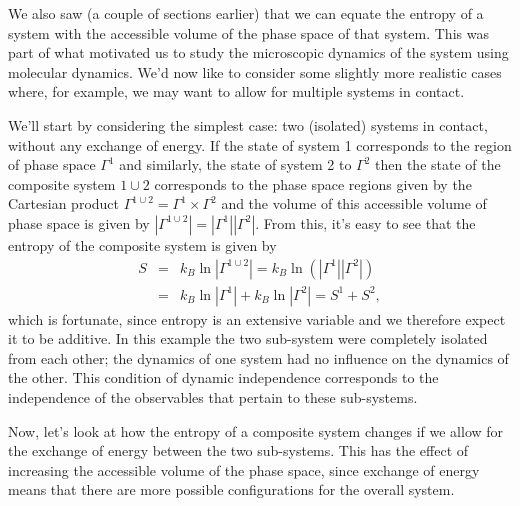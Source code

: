 \documentclass{article}
\begin{document}
We also saw (a couple of sections earlier) that we can equate the entropy of a system with the accessible volume of the phase space of that system. This was part of what motivated us to study the microscopic dynamics of the system using molecular dynamics.  We'd now like to consider some slightly more realistic cases where, for example, we may want to allow for multiple systems in contact.

We'll start by considering the simplest case: two (isolated) systems in contact, without any exchange of energy. If the state of system 1 corresponds to the region of phase space $\Gamma^1$ and similarly, the state of system 2 to $\Gamma^2$ then the state of the composite system $1\cup 2$ corresponds to the phase space regions given by the Cartesian product $\Gamma^{1\cup 2}=\Gamma^1\times\Gamma^2$ and the volume of this accessible volume of phase space is given by $|\Gamma^{1\cup 2}|=|\Gamma^1||\Gamma^2|$. From this, it's easy to see that the entropy of the composite system is given by
\begin{eqnarray*}
	S &=& k_B\ln|\Gamma^{1\cup 2}| = k_B\ln(|\Gamma^1||\Gamma^2|)\\
		&=& k_B\ln|\Gamma^1| + k_B\ln|\Gamma^2| = S^1 + S^2,
\end{eqnarray*}
which is fortunate, since entropy is an extensive variable and we therefore expect it to be additive.
In this example the two sub-system were completely isolated from each other; the dynamics of one system had no influence on the dynamics of the other. This condition of dynamic independence corresponds to the independence of the observables that pertain to these sub-systems.

Now, let's look at how the entropy of a composite system changes if we allow for the exchange of energy between the two sub-systems. This has the effect of increasing the accessible volume of the phase space, since exchange of energy means that there are more possible configurations for the overall system.
\end{document}

